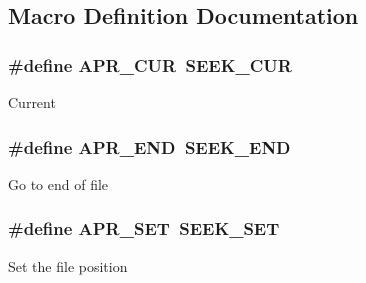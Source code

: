 \subsection{Macro Definition Documentation}
\hypertarget{group__apr__file__seek__flags_gae17abc53fea00bfd51e184017113e250}{
\subsubsection[{A\-P\-R\-\_\-\-C\-U\-R}]{\setlength{\rightskip}{0pt plus 5cm}\#define A\-P\-R\-\_\-\-C\-U\-R~S\-E\-E\-K\-\_\-\-C\-U\-R}}\label{group__apr__file__seek__flags_gae17abc53fea00bfd51e184017113e250}
Current \hypertarget{group__apr__file__seek__flags_ga438f3568be799d1e4bbd19492ca47d22}{
\subsubsection[{A\-P\-R\-\_\-\-E\-N\-D}]{\setlength{\rightskip}{0pt plus 5cm}\#define A\-P\-R\-\_\-\-E\-N\-D~S\-E\-E\-K\-\_\-\-E\-N\-D}}\label{group__apr__file__seek__flags_ga438f3568be799d1e4bbd19492ca47d22}
Go to end of file \hypertarget{group__apr__file__seek__flags_ga2fdf78845c897f69451d49e1e2b90ac9}{
\subsubsection[{A\-P\-R\-\_\-\-S\-E\-T}]{\setlength{\rightskip}{0pt plus 5cm}\#define A\-P\-R\-\_\-\-S\-E\-T~S\-E\-E\-K\-\_\-\-S\-E\-T}}\label{group__apr__file__seek__flags_ga2fdf78845c897f69451d49e1e2b90ac9}
Set the file position 